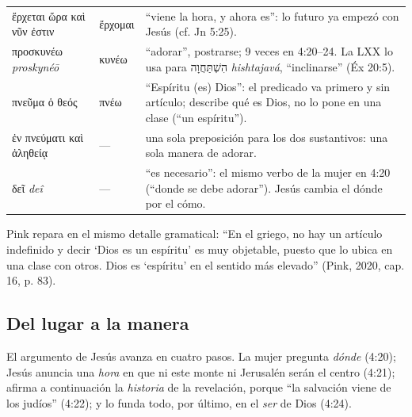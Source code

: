 \documentclass[11pt,letterpaper]{article}
\newcommand{\heb}[1]{\mbox{\foreignlanguage{hebrew}{#1}}}
\newcommand{\grc}[1]{\foreignlanguage{ancientgreek}{#1}}
\begin{document}
\begin{filologia}[Jn 4:23--24]
\begin{tabular}{@{}L{3.6cm}L{1.6cm}L{9.6cm}@{}}
\grc{ἔρχεται ὥρα καὶ νῦν ἐστιν} & \grc{ἔρχομαι} & ``viene la hora, y ahora es'': lo futuro ya empezó con Jesús (cf. Jn 5:25). \\[2pt]
\grc{προσκυνέω} \emph{proskynéō} & \grc{κυνέω} & ``adorar'', postrarse; 9 veces en 4:20--24. La LXX lo usa para \heb{הִשְׁתַּחֲוָה} \emph{hishtajavá}, ``inclinarse'' (Éx 20:5). \\[2pt]
\grc{πνεῦμα ὁ θεός} & \grc{πνέω} & ``Espíritu (es) Dios'': el predicado va primero y sin artículo; describe qué es Dios, no lo pone en una clase (``un espíritu''). \\[2pt]
\grc{ἐν πνεύματι καὶ ἀληθείᾳ} & --- & una sola preposición para los dos sustantivos: una sola manera de adorar. \\[2pt]
\grc{δεῖ} \emph{deî} & --- & ``es necesario'': el mismo verbo de la mujer en 4:20 (``donde se debe adorar''). Jesús cambia el dónde por el cómo. \\
\end{tabular}
\end{filologia}

Pink repara en el mismo detalle gramatical: ``En el griego, no hay un artículo indefinido y decir `Dios es un espíritu' es muy objetable, puesto que lo ubica en una clase con otros. Dios es `espíritu' en el sentido más elevado'' (Pink, 2020, cap. 16, p. 83).

\subsection{Del lugar a la manera}

El argumento de Jesús avanza en cuatro pasos. La mujer pregunta \emph{dónde} (4:20); Jesús anuncia una \emph{hora} en que ni este monte ni Jerusalén serán el centro (4:21); afirma a continuación la \emph{historia} de la revelación, porque ``la salvación viene de los judíos'' (4:22); y lo funda todo, por último, en el \emph{ser} de Dios (4:24).
\end{document}
